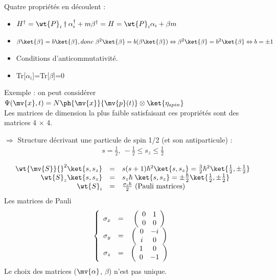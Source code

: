 Quatre propriétés en découlent :

\begin{itemize}[leftmargin=1cm,  itemsep=1pt]
\item $H^\dagger=\wt{P}_i\dagger\alpha_i^\dagger+m\beta^\dagger
=H=\wt{P}_i\alpha_i+\beta m$
\item $\beta\ket{\beta}=b\ket{\beta}, donc\ \beta^2\ket{\beta}=
b(\beta\ket{\beta})\Leftrightarrow\beta^2\ket{\beta}=
b^2\ket{\beta}\Leftrightarrow b=\pm 1$
\item Conditions d’anticommutativité.
\item Tr[$\alpha_i$]=Tr[$\beta$]=0
\end{itemize}
Exemple : on peut considérer $\Psi(\mv{x},t)=
N\ph{\mv{x}}{\mv{p}(t)}\otimes\ket{\eta_{spin}}$\\

Les matrices de dimension la plus faible satisfaisant ces propriétés sont des
matrices 4 × 4.

$\Rightarrow$ Structure décrivant une particule de spin 1/2 (et son
antiparticule) :
\setlength{\fboxsep}{3pt}
\[
\boxed{
\begin{array}{  c  }
 s=\frac{1}{2},\ -\frac{1}{2}\leqslant s_z\leqslant\frac{1}{2}\\
\end{array}}
\]
\setlength{\fboxsep}{7pt}
\[
\begin{array}{ r c l }
 \wt{\mv{S}}{}^2\ket{s,s_z} & = & s(s+1)\hbar^2\ket{s,s_z}=\frac{3}{2}
\hbar^2\ket{\frac{1}{2},\pm\frac{1}{2}} \\
 \wt{S}_z\ket{s,s_z} & = & s_z\hbar\;\ket{s,s_z}=\pm\frac{\hbar}{2}
\ket{\frac{1}{2},\pm\frac{1}{2}} \\
 \wt{S}_i & = & \frac{\sigma_i\hbar}{2}\ \text{(Pauli matrices)}\\
\end{array}
\]
Les matrices de Pauli
\[
\left\{
\begin{array}{ c c c }
 \sigma_x&=&\left(\begin{array}{cc}0&1\\0&0\\\end{array}\right)\\
 \sigma_y&=&\left(\begin{array}{cc}0&-i\\i&0\\\end{array}\right)\\
 \sigma_z&=&\left(\begin{array}{cc}1&0\\0&-1\\\end{array}\right)\\
\end{array}
\right .
\]
Le choix des matrices ($\mv{\alpha}$, $\beta$) n’est pas unique.

